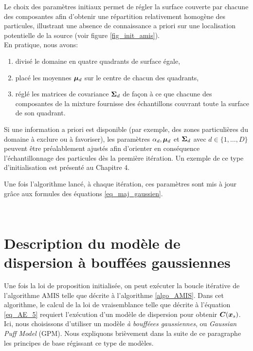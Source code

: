   Le choix des paramètres initiaux permet de régler la surface couverte par chacune des composantes afin d'obtenir une répartition relativement homogène des particules, illustrant une absence de connaissance a priori sur une localisation potentielle de la source (voir figure \ref{fig_init_amis}). \\
  
  En pratique, nous avons:
  
  \begin{enumerate}
  	\item divisé le domaine en quatre quadrants de surface égale, 
  	\item  placé les moyennes ${\bm{\mu}}_d$ sur le centre de chacun des quadrants,
  	\item réglé les matrices de covariance ${\bm{\Sigma}}_d$ de façon à ce que chacune des composantes de la mixture fournisse des échantillons couvrant toute la surface de son quadrant.\\
  \end{enumerate}
  
 {Si une information a priori est disponible (par exemple, des zones particulières du domaine à exclure ou à favoriser), les paramètres $\alpha_d, {\bm{\mu}}_d$ et ${\bm{\Sigma}}_d$ avec $d \in \{1,\dots,D\}$ peuvent être préalablement ajustés afin d'orienter en conséquence l'échantillonnage des particules dès la première itération. Un exemple de ce type d'initialisation est présenté au Chapitre 4.
 	
 	Une fois l'algorithme lancé, à chaque itération, ces paramètres  sont mis à jour grâce aux formules des équations \eqref{eq_maj_gaussien}.}\\


\section{Description du modèle de dispersion à bouffées gaussiennes}

Une fois la loi de proposition initialisée, on peut exécuter la boucle itérative de l'algorithme AMIS telle que décrite à l'algorithme \ref{algo_AMIS}. Dans cet algorithme, le calcul de la loi de vraisemblance telle que décrite à l'équation \eqref{eq_AE_5} requiert l'exécution d'un modèle de dispersion pour obtenir ${\bm{C}}({\bm{x}_s})$. Ici, nous choisissons d'utiliser un modèle \textit{à boufféees gaussiennes}, ou \textit{Gaussian Puff Model} (GPM). Nous expliquons brièvement dans la suite de ce paragraphe les principes de base régissant ce type de modèles.\\

